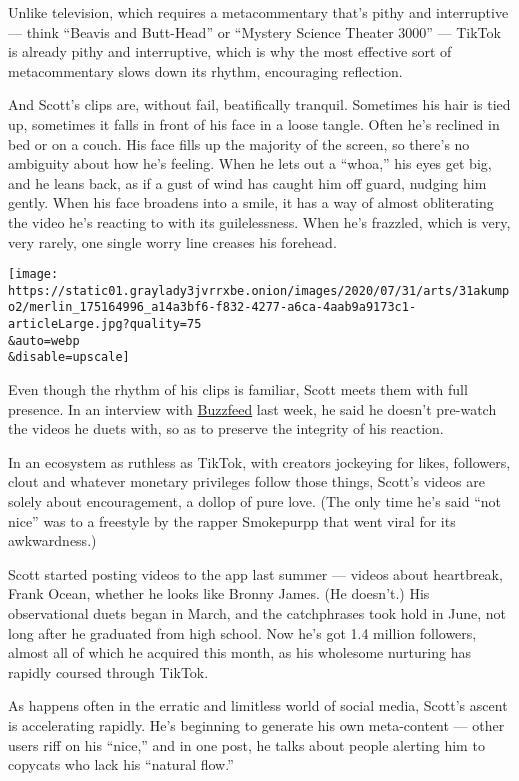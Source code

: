 Unlike television, which requires a metacommentary that's pithy and
interruptive --- think ``Beavis and Butt-Head'' or ``Mystery Science
Theater 3000'' --- TikTok is already pithy and interruptive, which is
why the most effective sort of metacommentary slows down its rhythm,
encouraging reflection.

And Scott's clips are, without fail, beatifically tranquil. Sometimes
his hair is tied up, sometimes it falls in front of his face in a loose
tangle. Often he's reclined in bed or on a couch. His face fills up the
majority of the screen, so there's no ambiguity about how he's feeling.
When he lets out a ``whoa,'' his eyes get big, and he leans back, as if
a gust of wind has caught him off guard, nudging him gently. When his
face broadens into a smile, it has a way of almost obliterating the
video he's reacting to with its guilelessness. When he's frazzled, which
is very, very rarely, one single worry line creases his forehead.

\texttt{[image: https://static01.graylady3jvrrxbe.onion/images/2020/07/31/arts/31akumpo2/merlin\_175164996\_a14a3bf6-f832-4277-a6ca-4aab9a9173c1-articleLarge.jpg?quality=75\\\&auto=webp\\\&disable=upscale]}

Even though the rhythm of his clips is familiar, Scott meets them with
full presence. In an interview with
\href{https://www.buzzfeednews.com/article/tanyachen/a-teen-has-become-famous-on-tiktok-simply-for-saying-whoa}{Buzzfeed}
last week, he said he doesn't pre-watch the videos he duets with, so as
to preserve the integrity of his reaction.

In an ecosystem as ruthless as TikTok, with creators jockeying for
likes, followers, clout and whatever monetary privileges follow those
things, Scott's videos are solely about encouragement, a dollop of pure
love. (The only time he's said ``not nice'' was to a freestyle by the
rapper Smokepurpp that went viral for its awkwardness.)

Scott started posting videos to the app last summer --- videos about
heartbreak, Frank Ocean, whether he looks like Bronny James. (He
doesn't.) His observational duets began in March, and the catchphrases
took hold in June, not long after he graduated from high school. Now
he's got 1.4 million followers, almost all of which he acquired this
month, as his wholesome nurturing has rapidly coursed through TikTok.

As happens often in the erratic and limitless world of social media,
Scott's ascent is accelerating rapidly. He's beginning to generate his
own meta-content --- other users riff on his ``nice,'' and in one post,
he talks about people alerting him to copycats who lack his ``natural
flow.''

